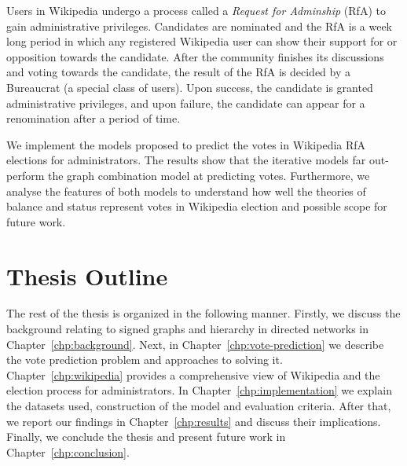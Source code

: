 Users in Wikipedia undergo a process called a \textit{Request for Adminship} (RfA) to gain administrative privileges.
Candidates are nominated and the RfA is a week long period in which any registered Wikipedia user can show their support for or opposition towards the candidate.
After the community finishes its discussions and voting towards the candidate, the result of the RfA is decided by a Bureaucrat (a special class of users).
Upon success, the candidate is granted administrative privileges, and upon failure, the candidate can appear for a renomination after a period of time.

We implement the models proposed to predict the votes in Wikipedia RfA elections for administrators.
The results show that the iterative models far out-perform the graph combination model at predicting votes. Furthermore, we analyse the features of both models to understand how well the theories of balance and status represent votes in Wikipedia election and possible scope for future work.

\section{Thesis Outline}
The rest of the thesis is organized in the following manner. Firstly, we discuss the background relating to signed graphs and hierarchy in directed networks in Chapter~\ref{chp:background}. Next, in Chapter~\ref{chp:vote-prediction} we describe the vote prediction problem and approaches to solving it. Chapter~\ref{chp:wikipedia} provides a comprehensive view of Wikipedia and the election process for administrators. In Chapter~\ref{chp:implementation} we explain the datasets used, construction of the model and evaluation criteria. After that, we report our findings in Chapter~\ref{chp:results} and discuss their implications. Finally, we conclude the thesis and present future work in Chapter~\ref{chp:conclusion}.